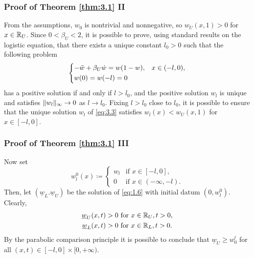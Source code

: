 \begin{frame}
    \frametitle{Proof of Theorem \ref{thm:3.1} II}
    \begin{proofc}
        From the assumptions, \(w_0\) is nontrivial and nonnegative, so \(w_U(x, 1) > 0\) for \(x \in \mathbb{R}_U\). Since \(0 < \beta_U < 2\), it is possible to prove, using standard results on the logistic equation, that there exists a unique constant \(l_0 > 0\) such that the following problem
        \begin{equation}
            \begin{dcases}
                -\ddot{w} + \beta_U \dot{w} = w(1 - w), & x \in (-l, 0), \\
                w(0) = w(-l) = 0
            \end{dcases}
            \label{eq:3.3}
        \end{equation}
        has a positive solution if and only if \(l > l_0\), and the positive solution \(w_l\) is unique and satisfies \(\lVert w_l\rVert_\infty \to 0\) as \(l \to l_0\). Fixing \(l > l_0\) close to \(l_0\), it is possible to ensure that the unique solution \(w_l\) of \eqref{eq:3.3} satisfies \(w_l(x) < w_U(x, 1)\) for \(x \in [-l, 0]\).
    \end{proofc}
\end{frame}

\begin{frame}
    \frametitle{Proof of Theorem \ref{thm:3.1} III}
    \begin{proofc}
        Now set 
    \begin{equation*}
        w_l^0(x) \coloneqq \begin{cases}
            w_l & \text{if } x \in [-l, 0], \\
            0 & \text{if } x \in (-\infty, -l).
        \end{cases}
    \end{equation*}
    Then, let \((\underline{w}_L. \underline{w}_U)\) be the solution of \eqref{eq:1.6} with initial datum \((0, w_l^0)\). Clearly,
    \begin{align*}
        \underline{w}_U(x, t) > 0 & \text{ for } x \in \mathbb{R}_U, t > 0, \\
        \underline{w}_L(x, t) > 0 & \text{ for } x \in \mathbb{R}_L, t > 0.
    \end{align*}
    By the parabolic comparison principle it is possible to conclude that \(\underline{w}_U \geq w_0^l\) for all \((x,t) \in [-l, 0] \times [0, +\infty)\).
    \end{proofc}
\end{frame}


